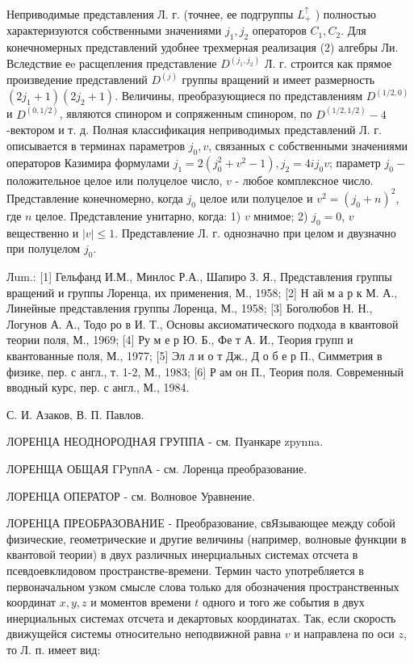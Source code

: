 \documentclass[10pt]{article}
\begin{document}
Неприводимые представления Л. г. (точнее, ее подгруппы $L_{+}^{\uparrow}$ ) полностью характеризуются собственными значениями $j_{1}, j_{2}$ операторов $C_{1}, C_{2}$. Для конечномерных представлений удобнее трехмерная реализация (2) алгебры Ли. Вследствие еe расщепления представление $D^{\left(j_{1}, j_{2}\right)}$ Л. г. строится как прямое произведение представлений $D^{(j)}$ группы вращений и имеет размерность $\left(2 j_{1}+1\right)\left(2 j_{2}+1\right)$. Величины, преобразующиеся по представлениям $D^{(1 / 2,0)}$ и $D^{(0,1 / 2)}$, являются спинором и сопряженным спинором, по $D^{(1 / 2,1 / 2)}-4$-вектором и т. д. Полная классификация неприводимых представлений Л. г. описывается в терминах параметров $j_{0}, v$, связанных с собственными значениями операторов Казимира формулами $j_{1}=2\left(j_{0}^{2}+v^{2}-1\right), j_{2}=4 i j_{0} v$; параметр $j_{0}-$ положительное целое или полуцелое число, $v$ - любое комплексное число. Представление конечномерно, когда $j_{0}$ целое или полуцелое и $v^{2}=\left(j_{0}+n\right)^{2}$, где $n$ целое. Представление унитарно, когда: 1) $v$ мнимое; 2) $j_{0}=0$, $v$ вещественно и $|v| \leqslant 1$. Представление Л. г. однозначно при целом и двузначно при полуцелом $j_{0}$.



Лum.: [1] Гельфанд И.М., Минлос Р.А., Шапиро З. Я., Представления группы вращений и группы Лоренца, их применения, М., 1958; [2] Н ай м а р к М. А., Линейные представления группы Лоренца, М., 1958; [3] Боголюбов Н. Н., Логунов А. А., Тодо ро в И. Т., Основы аксиоматического подхода в квантовой теории поля, М., 1969; [4] Ру м е р Ю. Б., Фе т А. И., Теория групп и квантованные поля, М., 1977; [5] Эл л и о т Дж., Д о б е р П., Симметрия в физике, пер. с англ., т. 1-2, М., 1983; [6] Р ам он П., Теория поля. Современный вводный курс, пер. с англ., М., 1984.



С. И. Азаков, В. П. Павлов.



ЛОРЕНЦА НЕОДНОРОДНАЯ ГРУППА - см. Пуанкаре zpynna.



ЛОРЕНЩА ОБЩАЯ ГPупกА - см. Лоренца преобразование.



ЛОРЕНЦА ОПЕРАТОР - см. Волновое Уравнение.



ЛОРЕНЦА ПРЕОБРАЗОВАНИЕ - Преобразование, свЯзывающее между собой физические, геометрические и другие величины (например, волновые функции в квантовой теории) в двух различных инерциальных системах отсчета в псевдоевклидовом пространстве-времени. Термин часто употребляется в первоначальном узком смысле слова только для обозначения пространственных координат $x, y, z$ и моментов времени $t$ одного и того же события в двух инерциальных системах отсчета и декартовых координатах. Так, если скорость движущейся системы относительно неподвижной равна $v$ и направлена по оси $z$, то Л. п. имеет вид:
\end{document}
